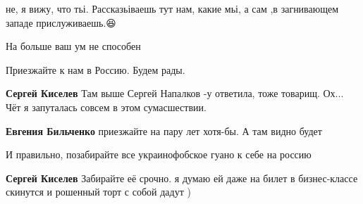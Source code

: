 \begin{itemize}
\begin{itemize}
не, я вижу, что тьі. Рассказьіваешь тут нам, какие мьі, а сам ,в загнивающем
западе прислуживаешь.😆

На больше ваш ум не способен

\end{itemize}

 
Приезжайте к нам в Россию. Будем рады.

\begin{itemize}
 
\textbf{Сергей Киселев} Там выше Сергей Напалков -у ответила, тоже товарищ. Ох... Чёт я запуталась совсем в этом сумасшествии.

 
\textbf{Евгения Бильченко} приезжайте на пару лет хотя-бы. А там видно будет

 
И правильно, позабирайте все украинофобское гуано к себе на россию

 
\textbf{Сергей Киселев} Забирайте её срочно. я думаю ей даже на билет в бизнес-классе скинутся и рошенный торт с собой дадут )

 

\end{itemize}
\end{itemize}
